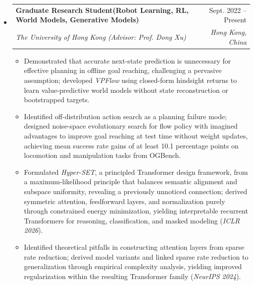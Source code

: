 \documentclass[letterpaper,11pt]{article}
\makeatletter
\newcommand{\resumeItem}[1]{
  \item\small{
    {#1 \vspace{-2pt}}
  }
}
\newcommand{\resumeSubheading}[4]{
  \vspace{-2pt}\item
    \begin{tabular*}{0.97\textwidth}[t]{l@{\extracolsep{\fill}}r}
      \textbf{#1} & #2 \\
      \textit{\small#3} & \textit{\small #4} \\
    \end{tabular*}\vspace{-7pt}
}
\newcommand{\resumeItemListStart}{\begin{itemize}}
\newcommand{\resumeItemListEnd}{\end{itemize}\vspace{-5pt}}
\makeatother
\begin{document}
\begin{itemize}[leftmargin=0.15in, itemsep=3pt,topsep=2pt]
    \resumeSubheading
      {Graduate Research Student{(\footnotesize Robot Learning, RL, World Models, Generative Models)}}{Sept. 2022 -- Present}
      {The University of Hong Kong (Advisor: Prof. Dong Xu)}{Hong Kong, China}
      \resumeItemListStart
        \resumeItem{Demonstrated that accurate next-state prediction is unnecessary for effective planning in offline goal reaching, challenging a pervasive assumption; developed \emph{VPFlow} using closed-form hindsight returns to learn value-predictive world models without state reconstruction or bootstrapped targets.}
        \resumeItem{Identified off-distribution action search as a planning failure mode; designed noise-space evolutionary search for flow policy with imagined advantages to improve goal reaching at test time without weight updates, achieving mean success rate gains of at least 10.1 percentage points on locomotion and manipulation tasks from OGBench.}
        \resumeItem{Formulated \emph{Hyper-SET}, a principled Transformer design framework, from a maximum-likelihood principle that balances semantic alignment and subspace uniformity, revealing a previously unnoticed connection; derived symmetric attention, feedforward layers, and normalization purely through constrained energy minimization, yielding interpretable recurrent Transformers for reasoning, classification, and masked modeling (\emph{ICLR 2026}).}
        \resumeItem{Identified theoretical pitfalls in constructing attention layers from sparse rate reduction; derived model variants and linked sparse rate reduction to generalization through empirical complexity analysis, yielding improved regularization within the resulting Transformer family (\emph{NeurIPS 2024}).}
      \resumeItemListEnd
      

\end{itemize}
\end{document}
